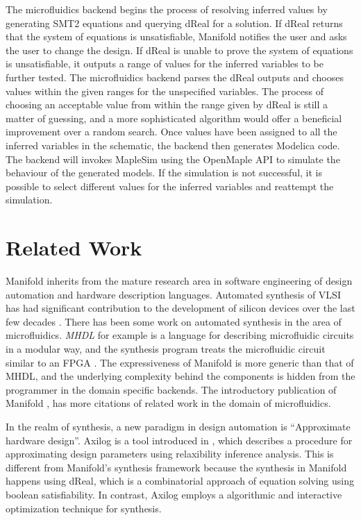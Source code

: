 The microfluidics backend begins the process of resolving inferred values by generating SMT2 equations
and querying dReal for a solution.
If dReal returns that the system of equations is unsatisfiable, Manifold notifies the
user and asks the user to change the design. If dReal is unable to prove the system of equations is unsatisfiable,
it outputs a range of values for the inferred variables to be further tested.
The microfluidics backend parses the dReal outputs and chooses values within the given ranges for the
unspecified variables.
The process of choosing an acceptable value from within the range given by dReal is still a matter of
guessing, and a more sophisticated algorithm would offer a beneficial improvement over a random search.
Once values have been assigned to all the inferred variables in the schematic, the backend then generates Modelica code.
The backend will invokes MapleSim using the OpenMaple API to simulate the behaviour of the generated models.
If the simulation is not successful, it is possible to select different values for the inferred variables
and reattempt the simulation.

\section{Related Work}

Manifold inherits from the mature research area in software engineering of
design automation and hardware description languages. Automated synthesis of VLSI has had
significant contribution to the development of silicon devices over the last few decades
\cite{MeadConway80}. There has been some work on automated synthesis in the area of microfluidics.
\emph{MHDL} for example is a language for describing microfluidic circuits in a modular way, and the
synthesis program treats the microfluidic circuit similar to an FPGA \cite{McDaniel13aspdac}. The
expressiveness of Manifold is more generic than that of MHDL, and the underlying complexity behind
the components is hidden from the programmer in the domain specific backends. The introductory
publication of Manifold \cite{Berzish16cascon}, has more citations of related work in the domain of
microfluidics.

In the realm of synthesis, a new paradigm in design automation is ``Approximate hardware design''.
Axilog is a tool introduced in \cite{axilog}, which describes a procedure for approximating design
parameters using relaxibility inference analysis. This is different from Manifold's synthesis
framework because the synthesis in Manifold happens using dReal, which is a combinatorial approach
of equation solving using boolean satisfiability. In contrast, Axilog employs a algorithmic and
interactive optimization technique for synthesis.


